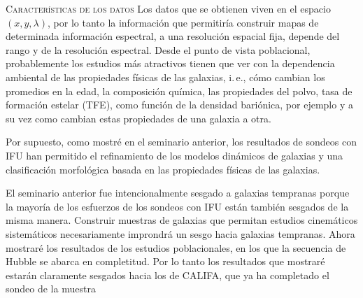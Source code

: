 \documentclass[xcolor=dvipsnames,4pt,hyperref={colorlinks,citecolor=black,linkcolor=black,urlcolor=black}]{beamer}
\begin{document}
\begin{frame}[allowframebreaks]{\textsc{Características de los datos}}
%
Los datos que se obtienen viven en el espacio $(x,y,\lambda)$, por lo tanto la información que
permitiría construir mapas de determinada información espectral, a una resolución espacial fija,
depende del rango y de la resolución espectral. Desde el punto de vista poblacional, probablemente
los estudios más atractivos tienen que ver con la dependencia ambiental de las propiedades físicas
de las galaxias, i.\,e., cómo cambian los promedios en la edad, la composición química, las
propiedades del polvo, tasa de formación estelar (TFE), como función de la densidad bariónica, por
ejemplo y a su vez como cambian estas propiedades de una galaxia a otra.

Por supuesto, como mostré en el seminario anterior, los resultados de sondeos con IFU han permitido
el refinamiento de los modelos dinámicos de galaxias y una clasificación morfológica basada en las
propiedades físicas de las galaxias.

El seminario anterior fue intencionalmente sesgado a galaxias tempranas porque la mayoría de los
esfuerzos de los sondeos con IFU están también sesgados de la misma manera. Construir muestras de
galaxias que permitan estudios cinemáticos sistemáticos necesariamente improndrá un sesgo hacia
galaxias tempranas. Ahora mostraré los resultados de los estudios poblacionales, en los que la
secuencia de Hubble se abarca en completitud. Por lo tanto los resultados que mostraré estarán
claramente sesgados hacia los de CALIFA, que ya ha completado el sondeo de la muestra

\end{frame}
\end{document}
